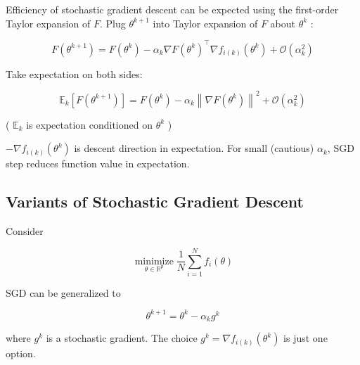 \begin{frame}[allowframebreaks]

\begin{myconceptblock}{2.11}{Efficiency of stochastic gradient descent can be expected using the first-order Taylor expansion of $F$.}
    Plug $\theta^{k+1}$ into Taylor expansion of $F$ about $\theta^{k}$ :

    $$
    F\left(\theta^{k+1}\right)=F\left(\theta^{k}\right)-\alpha_{k} \nabla F\left(\theta^{k}\right)^{\top} \nabla f_{i(k)}\left(\theta^{k}\right)+\mathcal{O}\left(\alpha_{k}^{2}\right)
    $$

    Take expectation on both sides:

    $$
    \mathbb{E}_{k}\left[F\left(\theta^{k+1}\right)\right]=F\left(\theta^{k}\right)-\alpha_{k}\left\|\nabla F\left(\theta^{k}\right)\right\|^{2}+\mathcal{O}\left(\alpha_{k}^{2}\right)
    $$

    ( $\mathbb{E}_{k}$ is expectation conditioned on $\theta^{k}$ )

    $-\nabla f_{i(k)}\left(\theta^{k}\right)$ is descent direction in expectation. For small (cautious) $\alpha_{k}$, SGD step reduces function value in expectation.
\end{myconceptblock}

\end{frame}

\subsection{Variants of Stochastic Gradient Descent}


\begin{frame}[allowframebreaks]

Consider

$$
\underset{\theta \in \mathbb{R}^{p}}{\operatorname{minimize}} \frac{1}{N} \sum_{i=1}^{N} f_{i}(\theta)
$$

SGD can be generalized to

$$
\theta^{k+1}=\theta^{k}-\alpha_{k} g^{k}
$$

where $g^{k}$ is a stochastic gradient. The choice $g^{k}=\nabla f_{i(k)}\left(\theta^{k}\right)$ is just one option.

\end{frame}

